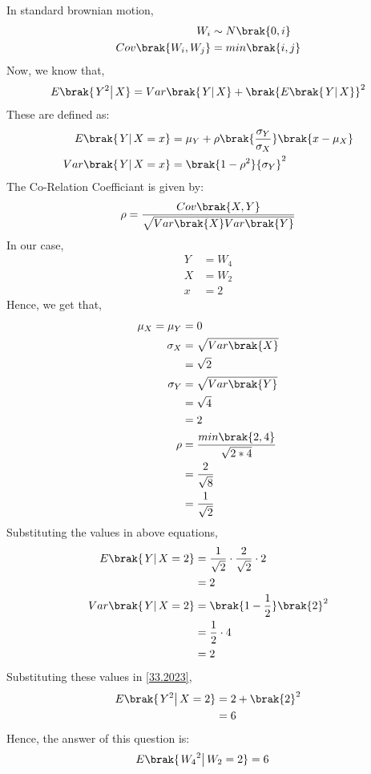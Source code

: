\documentclass[journal,12pt,twocolumn]{IEEEtran}
\theoremstyle{remark}
\begin{document}
\solution
\begin{table}[H]

\end{table}
In standard brownian motion, 
\begin{align}
W_i &\sim N\brak{0,i}\\
Cov\brak{W_i,W_j} &= min\brak{i,j} 
\end{align}
Now, we know that,
\begin{align}
E\brak{\left.Y^2\right | X} = Var\brak{\left.Y\right | X} + \brak{E\brak{\left.Y\right | X}}^2 \label{33.2023}
\end{align}
These are defined as:
\begin{align}
E\brak{\left.Y\right | X=x} &= \mu_Y +\rho\brak{\frac{\sigma_Y}{\sigma_X}}\brak{x - \mu_X}\\
Var\brak{\left.Y\right | X=x} &= \brak{1 - {\rho}^2}{\sigma_Y}^2
\end{align}
The Co-Relation Coefficiant is given by:
\begin{align}
\rho = \frac{Cov\brak{X,Y}}{\sqrt{Var\brak{X}Var\brak{Y}}}  
\end{align}
In our case, 
\begin{align}
Y &= W_4\\
X &= W_2\\
x &= 2
\end{align}
Hence, we get that,
\begin{align}
\mu_X = \mu_Y &= 0\\ 
\sigma_X &= \sqrt{Var\brak{X}}\\
	 &= \sqrt{2}\\
\sigma_Y &= \sqrt{Var\brak{Y}}\\
	 &= \sqrt{4}\\
	 &= 2\\
\rho &= \frac{min\brak{2,4}}{\sqrt{2*4}}\\
     &= \frac{2}{\sqrt{8}}\\
     &= \frac{1}{\sqrt{2}}
\end{align} 
Substituting the values in above equations,
\begin{align}
E\brak{\left.Y\right | X=2} &= \frac{1}{\sqrt{2}}\cdot\frac{2}{\sqrt{2}}\cdot 2\\
			    &= 2\\
Var\brak{\left.Y\right | X=2} &= \brak{1 - \frac{1}{2}}\brak{2}^2\\
			      &= \frac{1}{2}\cdot 4\\
			      &= 2\\
\end{align}
Substituting these values in \eqref{33.2023},
\begin{align}
E\brak{\left.Y^2\right | X=2} &= 2 + \brak{2}^2\\
			      &= 6
\end{align}
Hence, the answer of this question is:
\begin{align}
E\brak{\left.{W_4}^2\right | W_2=2} &= 6
\end{align}
\end{document}
